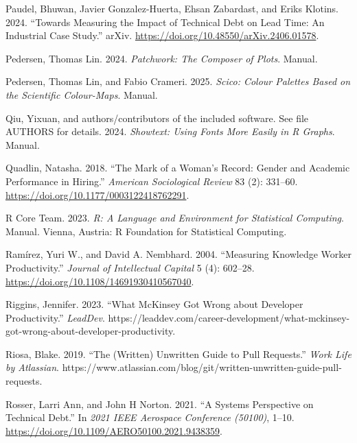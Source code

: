 \documentclass[
]{article}
\newlength{\cslhangindent}
\newenvironment{CSLReferences}[2] %
 {\begin{list}{}{%
  \setlength{\itemindent}{0pt}
  \setlength{\leftmargin}{0pt}
  \setlength{\parsep}{0pt}
  \ifodd #1
   \setlength{\leftmargin}{\cslhangindent}
   \setlength{\itemindent}{-1\cslhangindent}
  \fi
  \setlength{\itemsep}{#2\baselineskip}}}
 {\end{list}}
\begin{document}
\begin{CSLReferences}{1}{0}
Paudel, Bhuwan, Javier Gonzalez-Huerta, Ehsan Zabardast, and Eriks
Klotins. 2024. {``Towards {Measuring} the {Impact} of {Technical Debt}
on {Lead Time}: {An Industrial Case Study}.''} arXiv.
\url{https://doi.org/10.48550/arXiv.2406.01578}.

Pedersen, Thomas Lin. 2024. \emph{Patchwork: {The} Composer of Plots}.
Manual.

Pedersen, Thomas Lin, and Fabio Crameri. 2025. \emph{Scico: {Colour}
Palettes Based on the Scientific Colour-Maps}. Manual.

Qiu, Yixuan, and authors/contributors of the included software. See file
AUTHORS for details. 2024. \emph{Showtext: {Using} Fonts More Easily in
{R} Graphs}. Manual.

Quadlin, Natasha. 2018. {``The {Mark} of a {Woman}'s {Record}: {Gender}
and {Academic Performance} in {Hiring}.''} \emph{American Sociological
Review} 83 (2): 331--60. \url{https://doi.org/10.1177/0003122418762291}.

R Core Team. 2023. \emph{R: A Language and Environment for Statistical
Computing}. Manual. Vienna, Austria: R Foundation for Statistical
Computing.

Ramírez, Yuri W., and David A. Nembhard. 2004. {``Measuring Knowledge
Worker Productivity.''} \emph{Journal of Intellectual Capital} 5 (4):
602--28. \url{https://doi.org/10.1108/14691930410567040}.

Riggins, Jennifer. 2023. {``What {McKinsey} Got Wrong about Developer
Productivity.''} \emph{LeadDev}.
https://leaddev.com/career-development/what-mckinsey-got-wrong-about-developer-productivity.

Riosa, Blake. 2019. {``The (Written) Unwritten Guide to Pull
Requests.''} \emph{Work Life by Atlassian}.
https://www.atlassian.com/blog/git/written-unwritten-guide-pull-requests.

Rosser, Larri Ann, and John H Norton. 2021. {``A {Systems Perspective}
on {Technical Debt}.''} In \emph{2021 {IEEE Aerospace Conference}
(50100)}, 1--10. \url{https://doi.org/10.1109/AERO50100.2021.9438359}.


\end{CSLReferences}
\end{document}
